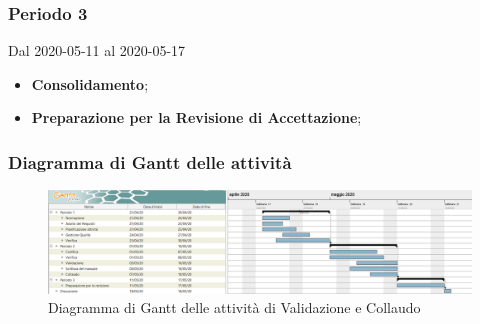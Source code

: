 \subsubsection{Periodo 3} 
Dal 2020-05-11 al 2020-05-17
\begin{itemize}
	\item \textbf{Consolidamento};
	\item \textbf{Preparazione per la Revisione di Accettazione};
\end{itemize}
\subsubsection{Diagramma di Gantt delle attività}
\begin{figure}[h]
	\includegraphics[scale=1.1]{sezioni/DiagrammiGantt/Validazione.png}
	\caption{Diagramma di Gantt delle attività di Validazione e Collaudo}
\end{figure}
